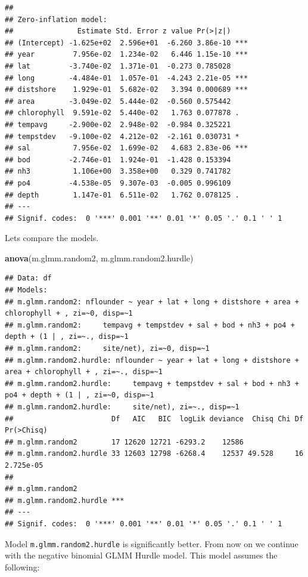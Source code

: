 \documentclass[
]{article}
\newenvironment{Shaded}{\begin{snugshade}}{\end{snugshade}}
\newcommand{\FunctionTok}[1]{\textcolor[rgb]{0.13,0.29,0.53}{\textbf{#1}}}
\newcommand{\NormalTok}[1]{#1}
\begin{document}
\begin{verbatim}
## 
## Zero-inflation model:
##               Estimate Std. Error z value Pr(>|z|)    
## (Intercept) -1.625e+02  2.596e+01  -6.260 3.86e-10 ***
## year         7.956e-02  1.234e-02   6.446 1.15e-10 ***
## lat         -3.740e-02  1.371e-01  -0.273 0.785028    
## long        -4.484e-01  1.057e-01  -4.243 2.21e-05 ***
## distshore    1.929e-01  5.682e-02   3.394 0.000689 ***
## area        -3.049e-02  5.444e-02  -0.560 0.575442    
## chlorophyll  9.591e-02  5.440e-02   1.763 0.077878 .  
## tempavg     -2.900e-02  2.948e-02  -0.984 0.325221    
## tempstdev   -9.100e-02  4.212e-02  -2.161 0.030731 *  
## sal          7.956e-02  1.699e-02   4.683 2.83e-06 ***
## bod         -2.746e-01  1.924e-01  -1.428 0.153394    
## nh3          1.106e+00  3.358e+00   0.329 0.741782    
## po4         -4.538e-05  9.307e-03  -0.005 0.996109    
## depth        1.147e-01  6.511e-02   1.762 0.078125 .  
## ---
## Signif. codes:  0 '***' 0.001 '**' 0.01 '*' 0.05 '.' 0.1 ' ' 1
\end{verbatim}

Lets compare the models.

\begin{Shaded}
\begin{Highlighting}[]
\FunctionTok{anova}\NormalTok{(m.glmm.random2, m.glmm.random2.hurdle)}
\end{Highlighting}
\end{Shaded}

\begin{verbatim}
## Data: df
## Models:
## m.glmm.random2: nflounder ~ year + lat + long + distshore + area + chlorophyll + , zi=~0, disp=~1
## m.glmm.random2:     tempavg + tempstdev + sal + bod + nh3 + po4 + depth + (1 | , zi=~., disp=~1
## m.glmm.random2:     site/net), zi=~0, disp=~1
## m.glmm.random2.hurdle: nflounder ~ year + lat + long + distshore + area + chlorophyll + , zi=~., disp=~1
## m.glmm.random2.hurdle:     tempavg + tempstdev + sal + bod + nh3 + po4 + depth + (1 | , zi=~0, disp=~1
## m.glmm.random2.hurdle:     site/net), zi=~., disp=~1
##                       Df   AIC   BIC  logLik deviance  Chisq Chi Df Pr(>Chisq)
## m.glmm.random2        17 12620 12721 -6293.2    12586                         
## m.glmm.random2.hurdle 33 12603 12798 -6268.4    12537 49.528     16  2.725e-05
##                          
## m.glmm.random2           
## m.glmm.random2.hurdle ***
## ---
## Signif. codes:  0 '***' 0.001 '**' 0.01 '*' 0.05 '.' 0.1 ' ' 1
\end{verbatim}

Model \texttt{m.glmm.random2.hurdle} is significantly better. From now
on we continue with the negative binomial GLMM Hurdle model. This model
assumes the following:
\end{document}
